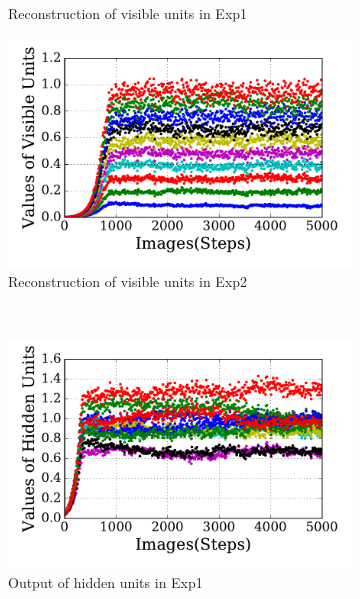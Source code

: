 \begin{figure}
\begin{subfigure}[t]{0.4\textwidth}
		\caption{Reconstruction of visible units in Exp1}
	\end{subfigure}
	\begin{subfigure}[t]{0.4\textwidth}
		\includegraphics[width=\textwidth]{pics_sdlm/31_exp_RBM_noise/exp2_recon_s.pdf}
		\caption{Reconstruction of visible units in Exp2}
	\end{subfigure}\\
	\begin{subfigure}[t]{0.4\textwidth}
		\includegraphics[width=\textwidth]{pics_sdlm/31_exp_RBM_noise/exp1_hid_s.pdf}
		\caption{Output of hidden units in Exp1}
	\end{subfigure}
	\begin{subfigure}[t]{0.4\textwidth}

\end{subfigure}
\end{figure}
